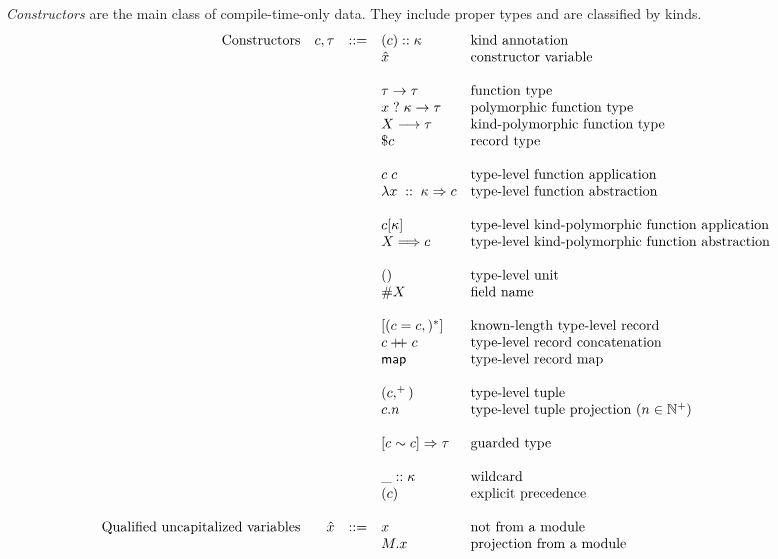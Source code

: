 \documentclass{article}
\newcommand{\mt}[1]{\mathsf{#1}}
\newcommand{\rc}{+ \hspace{-.075in} + \;}
\begin{document}
\emph{Constructors} are the main class of compile-time-only data.  They include proper types and are classified by kinds.
$$\begin{array}{rrcll}
  \textrm{Constructors} & c, \tau &::=& (c) :: \kappa & \textrm{kind annotation} \\
  &&& \hat{x} & \textrm{constructor variable} \\
  \\
  &&& \tau \to \tau & \textrm{function type} \\
  &&& x \; ? \; \kappa \to \tau & \textrm{polymorphic function type} \\
  &&& X \longrightarrow \tau & \textrm{kind-polymorphic function type} \\
  &&& \$ c & \textrm{record type} \\
  \\
  &&& c \; c & \textrm{type-level function application} \\
  &&& \lambda x \; :: \; \kappa \Rightarrow c & \textrm{type-level function abstraction} \\
  \\
  &&& c [\kappa] & \textrm{type-level kind-polymorphic function application} \\
  &&& X \Longrightarrow c & \textrm{type-level kind-polymorphic function abstraction} \\
  \\
  &&& () & \textrm{type-level unit} \\
  &&& \#X & \textrm{field name} \\
  \\
  &&& [(c = c,)^*] & \textrm{known-length type-level record} \\
  &&& c \rc c & \textrm{type-level record concatenation} \\
  &&& \mt{map} & \textrm{type-level record map} \\
  \\
  &&& (c,^+) & \textrm{type-level tuple} \\
  &&& c.n & \textrm{type-level tuple projection ($n \in \mathbb N^+$)} \\
  \\
  &&& [c \sim c] \Rightarrow \tau & \textrm{guarded type} \\
  \\
  &&& \_ :: \kappa & \textrm{wildcard} \\
  &&& (c) & \textrm{explicit precedence} \\
  \\
  \textrm{Qualified uncapitalized variables} & \hat{x} &::=& x & \textrm{not from a module} \\
  &&& M.x & \textrm{projection from a module} \\
\end{array}$$
\end{document}
